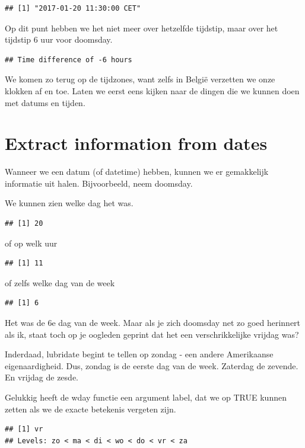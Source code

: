 \documentclass[]{tufte-book}
\begin{document}
\begin{verbatim}
## [1] "2017-01-20 11:30:00 CET"
\end{verbatim}

Op dit punt hebben we het niet meer over hetzelfde tijdstip, maar over het tijdstip 6 uur voor doomsday.

\begin{verbatim}
## Time difference of -6 hours
\end{verbatim}

We komen zo terug op de tijdzones, want zelfs in België verzetten we onze klokken af en toe. Laten we eerst eens kijken naar de dingen die we kunnen doen met datums en tijden.

\hypertarget{extract-information-from-dates}{%
\section{Extract information from dates}\label{extract-information-from-dates}}

Wanneer we een datum (of datetime) hebben, kunnen we er gemakkelijk informatie uit halen. Bijvoorbeeld, neem doomsday.

We kunnen zien welke dag het was.

\begin{verbatim}
## [1] 20
\end{verbatim}

of op welk uur

\begin{verbatim}
## [1] 11
\end{verbatim}

of zelfs welke dag van de week

\begin{verbatim}
## [1] 6
\end{verbatim}

Het was de 6e dag van de week. Maar als je zich doomsday net zo goed herinnert als ik, staat toch op je oogleden geprint dat het een verschrikkelijke vrijdag was?

Inderdaad, lubridate begint te tellen op zondag - een andere Amerikaanse eigenaardigheid. Dus, zondag is de eerste dag van de week. Zaterdag de zevende. En vrijdag de zesde.

Gelukkig heeft de wday functie een argument label, dat we op TRUE kunnen zetten als we de exacte betekenis vergeten zijn.

\begin{verbatim}
## [1] vr
## Levels: zo < ma < di < wo < do < vr < za
\end{verbatim}
\end{document}
